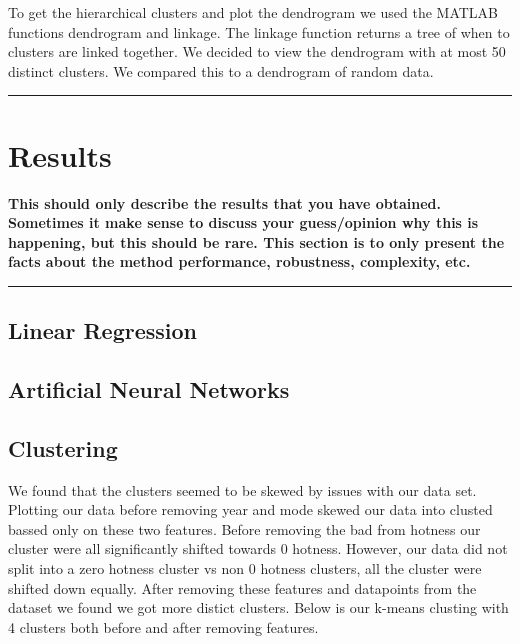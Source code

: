 \documentclass[12pt]{article}
\newcommand{\horizontalLine}{
	\begin{center}
		\hrule width 1.0\textwidth
	\end{center}
}
\newcommand{\smallHorizontalLine}{
    \begin{center}
        \hrule width 0.5\textwidth
    \end{center}}
\begin{document}
To get the hierarchical clusters and plot the dendrogram we used the MATLAB functions dendrogram and linkage. The linkage function returns a tree of when to clusters are linked together. We decided to view the dendrogram with at most 50 distinct clusters. We compared this to a dendrogram of random data.

\horizontalLine
\section{Results}
\label{sec:results}
\textbf{This should only describe the results that you have obtained. Sometimes it make sense
to discuss your guess/opinion why this is happening, but this should be rare. This section is to
only present the facts about the method performance, robustness, complexity, etc.}
\smallHorizontalLine

\subsection{Linear Regression}
\label{subsec:linearRegressionResults}

\subsection{Artificial Neural Networks}
\label{subsec:annResults}
\subsection{Clustering}
\label{subsec:clusteringResults}
We found that the clusters seemed to be skewed by issues with our data set. Plotting our data before removing year and mode skewed our data into clusted bassed only on these two features. Before removing the bad from hotness our cluster were all significantly shifted towards 0 hotness. However, our data did not split into a zero hotness cluster vs non 0 hotness clusters, all the cluster were shifted down equally. After removing these features and datapoints from the dataset we found we got more distict clusters. Below is our k-means clusting with 4 clusters both before and after removing features.

\end{document}
